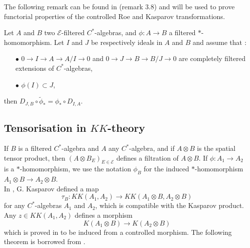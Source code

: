 The following remark can be found in \cite{OY2} (remark $3.8$) and will be used to prove functorial properties of the controlled Roe and Kasparov transformations.

\begin{rk}\label{rk3.8}
Let $A$ and $B$ two $\mathcal E$-filtered $C^*$-algebras, and $\phi : A\rightarrow B$ a filtered $*$-homomorphism. Let $I$ and $J$ be respectively ideals in $A$ and $B$ and assume that :
\begin{itemize}
\item[$\bullet$] $0 \rightarrow I \rightarrow A \rightarrow A/ I \rightarrow 0$ and $0 \rightarrow J \rightarrow B \rightarrow B/J \rightarrow 0$ are completely filtered extensions of $C^*$-algebras,
\item[$\bullet$] $\phi(I)\subset J$,
\end{itemize}
then $D_{J,B}\circ \tilde\phi_* = \phi_* \circ D_{I,A}$.
\end{rk}

\subsection{Tensorisation in $KK$-theory}

If $B$ is a filtered $C^*$-algebra and $A$ any $C^*$-algebra, and if $A\otimes B$ is the spatial tensor product, then $(A\otimes B_E)_{E\in\mathcal E}$ defines a filtration of $A\otimes B$. If $\phi : A_1 \rightarrow A_2$ is a $*$-homomorphism, we use the notation $\phi_B$ for the induced $*$-homomorphism $A_1\otimes B\rightarrow A_2\otimes B$. \\

In \cite{kasparovKKNovikov}, G. Kasparov defined a map
\[\tau_B : KK(A_1,A_2)\rightarrow KK(A_1\otimes B, A_2\otimes B)\]
for any $C^*$-algebras $A_1$ and $A_2$, which is compatible with the Kasparov product. Any $z\in KK(A_1,A_2)$ defines a morphism
\[K(A_1\otimes B)\rightarrow K(A_2\otimes B)\]
which is proved in \cite{OY2} to be induced from a controlled morphism. The following theorem is borrowed from \cite{OY2}.\\

